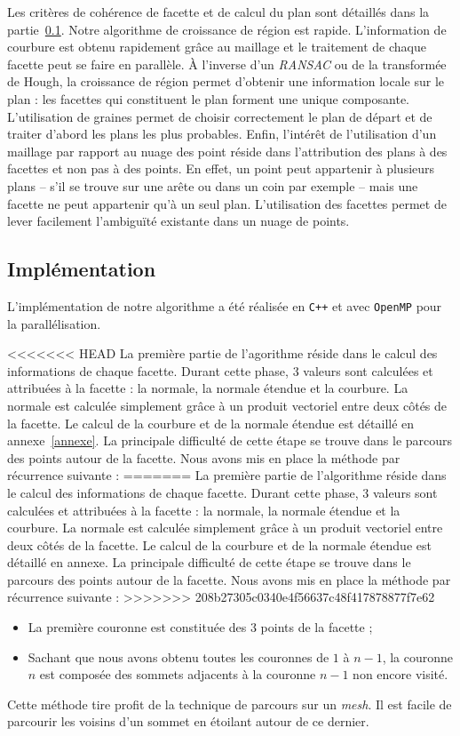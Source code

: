 ﻿\documentclass[12pt, twoside]{article}
\begin{document}
Les critères de cohérence de facette et de calcul du plan sont détaillés dans la partie~\ref{subsec:growthimpl}. Notre algorithme de croissance de région est rapide. L'information de courbure est obtenu rapidement grâce au maillage et le traitement de chaque facette peut se faire en parallèle. À l'inverse d'un \textit{RANSAC} ou de la transformée de Hough, la croissance de région permet d'obtenir une information locale sur le plan : les facettes qui constituent le plan forment une unique composante. L'utilisation de graines permet de choisir correctement le plan de départ et de traiter d'abord les plans les plus probables. Enfin, l'intérêt de l'utilisation d'un maillage par rapport au nuage des point réside dans l'attribution des plans à des facettes et non pas à des points. En effet, un point peut appartenir à plusieurs plans -- s'il se trouve sur une arête ou dans un coin par exemple -- mais une facette ne peut appartenir qu'à un seul plan. L'utilisation des facettes permet de lever facilement l'ambiguïté existante dans un nuage de points.

\subsection{Implémentation}
\label{subsec:growthimpl}
L'implémentation de notre algorithme a été réalisée en \texttt{C++} et avec \texttt{OpenMP} pour la parallélisation.

<<<<<<< HEAD
La première partie de l'agorithme réside dans le calcul des informations de chaque facette. Durant cette phase, 3 valeurs sont calculées et attribuées à la facette : la normale, la normale étendue et la courbure. La normale est calculée simplement grâce à un produit vectoriel entre deux côtés de la facette. Le calcul de la courbure et de la normale étendue est détaillé en annexe~\ref{annexe}. La principale difficulté de cette étape se trouve dans le parcours des points autour de la facette. Nous avons mis en place la méthode par récurrence suivante :
=======
La première partie de l'algorithme réside dans le calcul des informations de chaque facette. Durant cette phase, 3 valeurs sont calculées et attribuées à la facette : la normale, la normale étendue et la courbure. La normale est calculée simplement grâce à un produit vectoriel entre deux côtés de la facette. Le calcul de la courbure et de la normale étendue est détaillé en annexe. La principale difficulté de cette étape se trouve dans le parcours des points autour de la facette. Nous avons mis en place la méthode par récurrence suivante :
>>>>>>> 208b27305c0340e4f56637c48f417878877f7e62
\begin{itemize}
  \item La première couronne est constituée des 3 points de la facette ;
  \item Sachant que nous avons obtenu toutes les couronnes de $1$ à $n-1$, la couronne $n$ est composée des sommets adjacents à la couronne $n-1$ non encore visité.
\end{itemize}
Cette méthode tire profit de la technique de parcours sur un \textit{mesh}. Il est facile de parcourir les voisins d'un sommet en étoilant autour de ce dernier.
\end{document}
